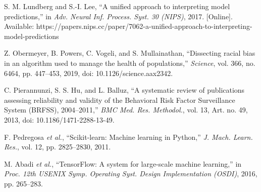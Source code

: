  S. M. Lundberg and S.-I. Lee, ``A unified approach to interpreting model predictions,'' in \emph{Adv. Neural Inf. Process. Syst. 30 (NIPS)}, 2017. [Online]. Available: https://papers.nips.cc/paper/7062-a-unified-approach-to-interpreting-model-predictions

 Z. Obermeyer, B. Powers, C. Vogeli, and S. Mullainathan, ``Dissecting racial bias in an algorithm used to manage the health of populations,'' \emph{Science}, vol. 366, no. 6464, pp. 447--453, 2019, doi: 10.1126/science.aax2342.

 C. Pierannunzi, S. S. Hu, and L. Balluz, ``A systematic review of publications assessing reliability and validity of the Behavioral Risk Factor Surveillance System (BRFSS), 2004--2011,'' \emph{BMC Med. Res. Methodol.}, vol. 13, Art. no. 49, 2013, doi: 10.1186/1471-2288-13-49.

 F. Pedregosa \emph{et al.}, ``Scikit-learn: Machine learning in Python,'' \emph{J. Mach. Learn. Res.}, vol. 12, pp. 2825--2830, 2011.

 M. Abadi \emph{et al.}, ``TensorFlow: A system for large-scale machine learning,'' in \emph{Proc. 12th USENIX Symp. Operating Syst. Design Implementation (OSDI)}, 2016, pp. 265--283.
